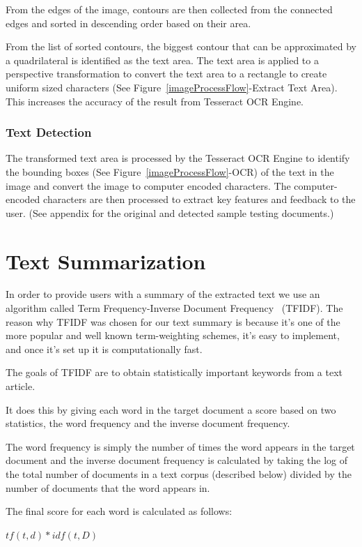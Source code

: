 From the edges of the image, contours are then collected \cite{contours} from the connected edges and sorted in descending order based on their area.

From the list of sorted contours, the biggest contour that can be approximated by a quadrilateral is identified as the text area. The text area is applied to a perspective transformation to convert the text area to a rectangle	 to create uniform sized characters (See Figure~\ref{imageProcessFlow}-Extract Text Area). This increases the accuracy of the result from Tesseract OCR Engine. 

\subsubsection{Text Detection}
The transformed text area is processed by the Tesseract OCR Engine to identify the bounding boxes (See Figure~\ref{imageProcessFlow}-OCR) of the text in the image and convert the image to computer encoded characters. The computer-encoded characters are then processed to extract key features and feedback to the user. (See appendix for the original and detected sample testing documents.)

\section{Text Summarization}
In order to provide users with a summary of the extracted text we use an algorithm called Term Frequency-Inverse Document Frequency \cite{tfidf} ~(TFIDF). The reason why TFIDF was chosen for our text summary is because it's one of the more popular and well known term-weighting schemes, it's easy to implement, and once it's set up it is computationally fast.

The goals of TFIDF are to obtain statistically important keywords from a text article. 

It does this by giving each word in the target document a score based on two statistics, the word frequency and the inverse document frequency.

The word frequency is simply the number of times the word appears in the target document and the inverse document frequency is calculated by taking the log of the total number of documents in a text corpus (described below) divided by the number of documents that the word appears in.

The final score for each word is calculated as follows: 

	\forceindent $tf(t, d) * idf(t, D)$  

